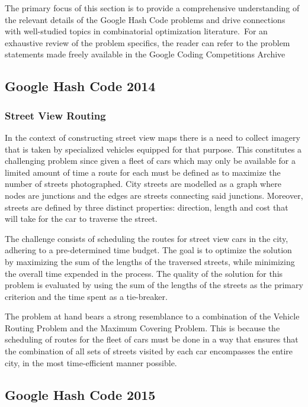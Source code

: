 The primary focus of this section is to provide a comprehensive understanding of
the relevant details of the Google Hash Code problems and drive connections with
well-studied topics in combinatorial optimization literature.~For an exhaustive
review of the problem specifics, the reader can refer to the problem statements
made freely available in the Google Coding Competitions
Archive~\cite{googlellc2023codingcompetitionsarchive}

\subsection{Google Hash Code 2014}
\label{subsec:hashcode-2014}

\subsubsection*{Street View Routing}
\label{subsubsec:hashcode-2014-final}

In the context of constructing street view maps there is a need to collect
imagery that is taken by specialized vehicles equipped for that purpose. This
constitutes a challenging problem since given a fleet of cars which may only be
available for a limited amount of time a route for each must be defined as to
maximize the number of streets photographed. City streets are modelled as a
graph where nodes are junctions and the edges are streets connecting said
junctions. Moreover, streets are defined by three distinct properties:
direction, length and cost that will take for the car to traverse the street.

The challenge consists of scheduling the routes for street view cars in the
city, adhering to a pre-determined time budget. The goal is to optimize the
solution by maximizing the sum of the lengths of the traversed streets, while
minimizing the overall time expended in the process. The quality of the solution
for this problem is evaluated by using the sum of the lengths of the streets as
the primary criterion and the time spent as a tie-breaker.

The problem at hand bears a strong resemblance to a combination of the Vehicle
Routing Problem and the Maximum Covering Problem. This is because the scheduling
of routes for the fleet of cars must be done in a way that ensures that the
combination of all sets of streets visited by each car encompasses the entire
city, in the most time-efficient manner possible.

\subsection{Google Hash Code 2015}
\label{subsec:hashcode-2015}

